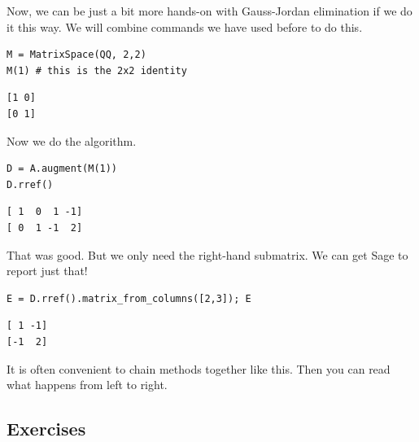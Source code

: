 \documentclass[10pt,]{book}
\theoremstyle{plain}
\numberwithin{equation}{section}
\begin{document}
      Now, we can be just a bit more hands-on with Gauss-Jordan elimination
      if we do it this way. We will combine commands we have used before to
      do this.
\begin{lstlisting}[style=sageinput]
M = MatrixSpace(QQ, 2,2)
M(1) # this is the 2x2 identity
\end{lstlisting}
\begin{lstlisting}[style=sageoutput]
[1 0]
[0 1]
\end{lstlisting}
\par

      Now we do the algorithm.
\begin{lstlisting}[style=sageinput]
D = A.augment(M(1))
D.rref()
\end{lstlisting}
\begin{lstlisting}[style=sageoutput]
[ 1  0  1 -1]
[ 0  1 -1  2]
\end{lstlisting}
\par

      That was good. But we only need the right-hand submatrix. We can get Sage
      to report just that!
\begin{lstlisting}[style=sageinput]
E = D.rref().matrix_from_columns([2,3]); E
\end{lstlisting}
\begin{lstlisting}[style=sageoutput]
[ 1 -1]
[-1  2]
\end{lstlisting}
\par

      It is often convenient to chain methods together like this. Then you can
      read what happens from left to right.
\typeout{************************************************}
\typeout{************************************************}
\subsection[Exercises]{Exercises}\label{subsection-45}
\end{document}
